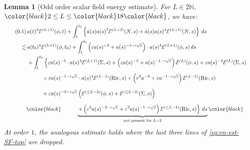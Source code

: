 \documentclass[11pt,leqno,textwidth=10cm]{amsart}
\numberwithin{equation}{section}
\theoremstyle{definition}
\theoremstyle{plain}
\newtheorem{lemma}[definition]{Lemma}
\newcommand{\1}{\mathbbm{1}}
\newcommand{\E}{\mathcal{E}}
\newcommand{\N}{\mathbb{N}}
\newcommand{\Ric}{\text{\normalfont{Ric}}}
\renewcommand{\epsilon}{\varepsilon}
\newcommand{\Lap}{\Delta}
\newcommand{\numberthis}{\addtocounter{equation}{1}\tag{\theequation}}
\renewcommand{\theequation}{\arabic{section}.\arabic{equation}}
\newcommand{\change}[1]{\color{black}#1\color{black}}
\begin{document}
\begin{lemma}[Odd order scalar field energy estimate]\label{lem:en-est-SF-top}
For $L\in2\N$, $\change{2\leq L\leq \change{18}$}, we have:
\begin{align*}
\numberthis\label{eq:en-est-SF-top}&\,a(t)^4\E^{(L+1)}(\phi,t)+\int_t^{t_0}\left\{\dot{a}(s)a(s)^7\E^{(L+2)}(N,s)+\dot{a}(s)a(s)^3\E^{(L+1)}(N,s)\right\}\,ds\\
\lesssim&\,a(t_0)^4\E^{(L+1)}(\phi,t_0)+\int_t^{t_0}\left(\epsilon a(s)^{-3}+a(s)^{-1-c\sqrt{\epsilon}}\right)\cdot a(s)^4\E^{(L+1)}(\phi,s)\,ds\\
&\,+\int_t^{t_0}\left\{\epsilon a(s)^{-3}\cdot a(s)^4\E^{(L+1)}(\Sigma,s)+\left(\epsilon a(s)^{-3}+a(s)^{-1-c\sqrt{\epsilon}}\right)\E^{(L)}(\phi,s)+\epsilon a(s)^{-3}\E^{(L)}(\Sigma,s)\right.\\
&\,\phantom{+\int_t^{t_0}}+\epsilon a(s)^{-1-c\sqrt{\epsilon}}\cdot a(s)^4\E^{(L-1)}(\Ric,s)+\left(\epsilon^3a^{-3}+\epsilon a^{-1-c\sqrt{\epsilon}}\right)\E^{(L-2)}(\Ric,s)\\
&\,\phantom{+\int_t^{t_0}}+{\epsilon}a(s)^{-3-c\sqrt{\epsilon}}\left(\E^{(\leq L-2)}(\phi,s)+\E^{(\leq L-2)}(\Sigma,s)\right)\\
&\change{\,\phantom{+\int_t^{t_0}}\underbrace{\left.+\left(\epsilon^3a(s)^{-3-c\sqrt{\epsilon}}+\epsilon^2a(s)^{-1-c\sqrt{\epsilon}}\right)\E^{(\leq L-4)}(\Ric,s)\right\}\,ds}_{\text{not present for }L=2}}
\end{align*}
\change{At order $1$, the analogous estimate holds where the last three lines of \eqref{eq:en-est-SF-top} are dropped.}
\end{lemma}
\end{document}
